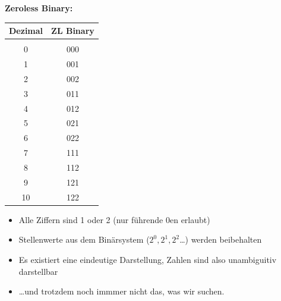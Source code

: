 \documentclass{beamer}
\begin{document}
\begin{frame}
\textbf{Zeroless Binary:}

\begin{multicols}{2}

\begin{tabular}{c|c}
Dezimal & ZL Binary \\ 
\hline
&\\
0&000\\
1&001\\
2&002\\
3&011\\
4&012\\
5&021\\
6&022\\
7&111\\
8&112\\
9&121\\
10&122\\
\end{tabular}
\columnbreak
\pause

\begin{itemize}
\item Alle Ziffern sind 1 oder 2 (nur führende 0en erlaubt)\pause
\item Stellenwerte aus dem Binärsystem ($2^0, 2^1, 2^2$\dots) werden beibehalten\pause
\item Es existiert eine eindeutige Darstellung, Zahlen sind also unambiguitiv darstellbar\pause
\item \dots und trotzdem noch immmer nicht das, was wir suchen.
\end{itemize}

\end{multicols}
\end{frame}

\end{document}
